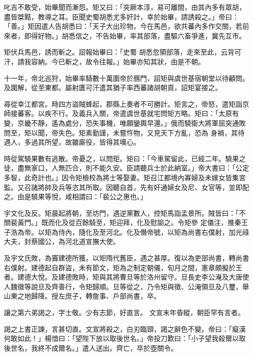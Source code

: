 \begin{pinyinscope}
 叱吉不敢受，始畢聞而漸怨。矩又曰：「突厥本淳，易可離間，由其內多有眾胡，盡皆桀黠，教導之耳。臣聞史蜀胡悉尤多奸計，幸於始畢，請誘殺之。」帝曰：「善。」矩因遣人告胡悉曰：「天子大出珍物，今在馬邑，欲共蕃內多作交關，若前來者，即得好物。」胡悉信之，不告始畢，率其部落，盡驅六畜爭進，冀先互市。



 矩伏兵馬邑，誘而斬之。詔報始畢曰：「史蜀
 胡悉忽領部落，走來至此，云背可汗，請我容納。今已斬之，故令往報。」始畢亦知其狀，由是不朝。



 十一年，帝北巡狩，始畢率騎數十萬圍帝於鴈門，詔矩與虞世基宿朝堂以待顧問。及圍解，從至東都。屬射匱可汗遣其猶子率西蕃諸胡朝貢，詔矩宴接之。



 尋從幸江都宮。時四方盜賊蜂起，郡縣上奏者不可勝計。矩言之，帝怒，遣矩詣京師接蕃客。以疾不行。及義兵入關，帝遣虞世基就宅問矩方略。矩曰：「太原有變，京畿不靜，遙為處分，恐失事機，唯願鑾輿早還。」俄而驍衛大將軍屈突通敗問至，矩以聞，帝失色。矩素勤謹，未嘗忤物，又見天下方亂，恐為
 身禍，其待遇人，多過其所望，故雖廝役，皆得其嘆心。



 時從駕驍果數有逃散。帝憂之，以問矩。矩曰：「今車駕留此，已經二年。驍果之徒，盡無家口，人無匹合，則不能久安。臣請聽兵士於此納室。」帝大書曰：「公定多智，此奇計也。」因令矩檢校為將士等娶妻。矩召江都境內寡婦及未嫁女皆集宮監。又召諸將帥及兵等恣其所取。因聽自首，先有奸通婦女及尼、女官等，並即配之。由是驍果等悅，咸相謂曰：「裴公之惠也。」



 宇文化及反。矩晨起將朝，至坊門，遇逆黨數人，控矩馬詣孟景所。賊皆曰：「不關裴黃門。」既而化及從百餘騎至，矩迎拜，化及慰諭之。令矩參
 定儀注，推秦王子浩為帝。以矩為侍內，隨化及至河北。化及僭帝號，以矩為尚書右僕射，加光祿大夫，封蔡國公，為河北道宣撫大使。



 及宇文氏敗，為竇建德所獲。以矩隋代舊臣，遇之甚厚。復以為吏部尚書，轉尚書右僕射。建德起自群盜，未有節文，矩為之制定朝儀，旬月之間，憲章頗擬於王者。建德大悅。及建德敗時，矩與其將曹旦等於洛州留守。旦長史李公淹及大唐使人魏徵等說旦及齊善行，令矩歸順。旦等從之，乃令矩與徵、公淹領旦及八璽，舉山東之地歸降。授左庶子，轉詹事、戶部尚書，卒。



 讓之第六弟謁之，字士敬。少有志節，好直言。
 文宣末年昏縱，朝臣罕有言者。



 謁之上書正諫，言甚切直。文宣將殺之，白刃臨頸，謁之辭色不變。帝曰：「癡漢何敢如此！」楊愔曰：「望陛下放以取後世名。」帝投刀歎曰：「小子望我殺爾以取後世名，我終不成爾名。」遣人送出。齊亡，卒於壺關令。




\end{pinyinscope}
